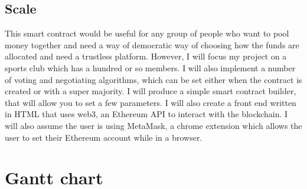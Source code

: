 \subsection{Scale}
This smart contract would be useful for any group of people who want to pool money together and need a way of democratic way of choosing how the funds are allocated and need a trustless platform. However, I will focus my project on a sports club which has a hundred or so members. I will also implement a number of voting and negotiating algorithms, which can be set either when the contract is created or with a super majority. I will produce a simple smart contract builder, that will allow you to set a few parameters. I will also create a front end written in HTML that uses web3, an Ethereum API to interact with the blockchain. I will also assume the user is using MetaMask, a chrome extension which allows the user to set their Ethereum account while in a browser.
\section{Gantt chart}
